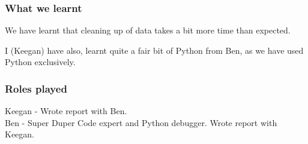 \documentclass[a4paper,12pt]{article}
\numberwithin{equation}{section}
\begin{document}
\subsubsection*{What we learnt}

We have learnt that cleaning up of data takes a bit more time than expected. 

I (Keegan) have also, learnt quite a fair bit of Python from Ben, as we have used Python exclusively. 


\subsubsection*{Roles played}

Keegan - Wrote report with Ben.  \\
Ben - Super Duper Code expert and Python debugger. Wrote report with Keegan.

\clearpage

	
\end{document}
